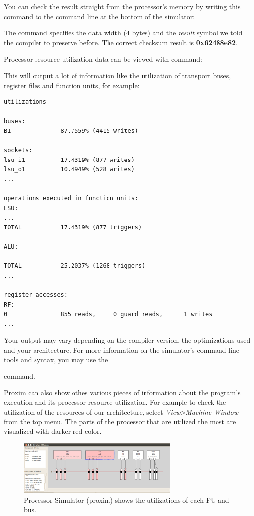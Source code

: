 \documentclass[twoside]{tceusermanual}
\begin{document}
You can check the result straight from the processor's memory by writing this
command to the command line at the bottom of the simulator:


The command specifies the data width (4 bytes) and the \textit{result} symbol we
told the compiler to preserve before. The correct checksum result is
\textbf{0x62488e82}.

Processor resource utilization data can be viewed with command:


This will output a lot of information like the utilization of transport buses,
register files and function units, for example: 

\begin{verbatim}
utilizations
------------
buses:
B1              87.7559% (4415 writes)

sockets:
lsu_i1          17.4319% (877 writes)
lsu_o1          10.4949% (528 writes)
...

operations executed in function units:
LSU:
...
TOTAL           17.4319% (877 triggers)

ALU:
...
TOTAL           25.2037% (1268 triggers)
...

register accesses:
RF:
0               855 reads,     0 guard reads,      1 writes       
...

\end{verbatim}

Your output may vary depending on the compiler version, the optimizations
used and your architecture. For more information on the simulator's command 
line tools and syntax, you may use the 


command.

Proxim can also show othes various pieces of information about the
program's execution and its processor resource utilization. For
example to check the utilization of the resources of our architecture,
select \textit{View>Machine Window} from the top menu. The parts of
the processor that are utilized the most are visualized with darker
red color.

\begin{figure}
  \begin{center}
    \includegraphics[width=0.7\textwidth]{eps/proxim_util.eps}
    \caption{Processor Simulator (proxim) shows the utilizations of each FU and bus.}
    \label{fig:proxim_util}
  \end{center}
\end{figure}
\end{document}
